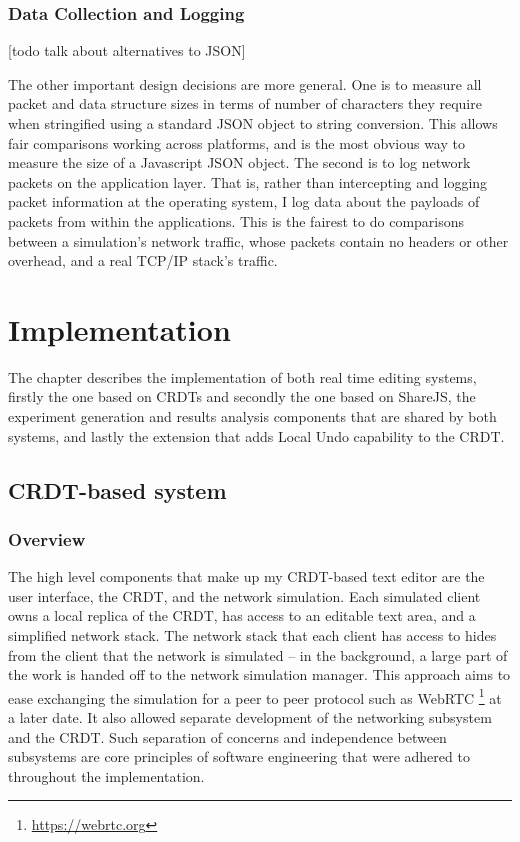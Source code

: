 \documentclass[12pt,a4paper,twoside,openright]{report}
\begin{document}

	\subsection{Data Collection and Logging}
	
	[todo talk about alternatives to JSON]
	
	The other important design decisions are more general. One is to measure all packet and data structure sizes in terms of number of characters they require when stringified using a standard JSON object to string conversion. This allows fair comparisons working across platforms, and is the most obvious way to measure the size of a Javascript JSON object. The second is to log network packets on the application layer. That is, rather than intercepting and logging packet information at the operating system, I log data about the payloads of packets from within the applications. This is the fairest to do comparisons between a simulation's network traffic, whose packets contain no headers or other overhead, and a real TCP/IP stack's traffic.


\chapter{Implementation}

The chapter describes the implementation of both real time editing systems, firstly the one based on CRDTs and secondly the one based on ShareJS, the experiment generation and results analysis components that are shared by both systems, and lastly the extension that adds Local Undo capability to the CRDT.


\section{CRDT-based system}

	\subsection{Overview}
	The high level components that make up my CRDT-based text editor are the user interface, the CRDT, and the network simulation. Each simulated client owns a local replica of the CRDT, has access to an editable text area, and a simplified network stack. The network stack that each client has access to hides from the client that the network is simulated -- in the background, a large part of the work is handed off to the network simulation manager. This approach aims to ease exchanging the simulation for a peer to peer protocol such as WebRTC \footnote{\url{https://webrtc.org}} at a later date. It also allowed separate development of the networking subsystem and the CRDT. Such separation of concerns and independence between subsystems are core principles of software engineering that were adhered to throughout the implementation.
	
\end{document}
